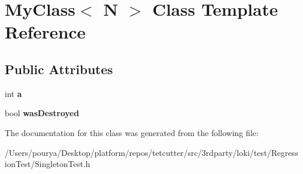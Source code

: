 \hypertarget{classMyClass}{}\section{My\+Class$<$ N $>$ Class Template Reference}
\label{classMyClass}
\subsection*{Public Attributes}
\begin{DoxyCompactItemize}
\item 
\hypertarget{classMyClass_a62ffdfa1f1a00aa289ea3261e4e13075}{}int {\bfseries a}\label{classMyClass_a62ffdfa1f1a00aa289ea3261e4e13075}

\item 
\hypertarget{classMyClass_a8624ee7e6792c2343ae321165bfb34b6}{}bool {\bfseries was\+Destroyed}\label{classMyClass_a8624ee7e6792c2343ae321165bfb34b6}

\end{DoxyCompactItemize}


The documentation for this class was generated from the following file\+:\begin{DoxyCompactItemize}
\item 
/\+Users/pourya/\+Desktop/platform/repos/tetcutter/src/3rdparty/loki/test/\+Regression\+Test/Singleton\+Test.\+h\end{DoxyCompactItemize}
